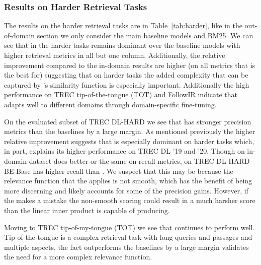 \documentclass[sigconf,]{acmart}
\begin{document}
\subsubsection{Results on Harder Retrieval Tasks}
The results on the harder retrieval tasks are in Table~\ref{tab:harder}, like in the out-of-domain section we only consider the main baseline models and BM25. We can see that in the harder tasks \name{} remains dominant over the baseline models with higher retrieval metrics in all but one column. Additionally, the relative improvement compared to the in-domain results are higher (on all metrics that \name{} is the best for) suggesting that on harder tasks the added complexity that can be captured by \name{}'s similarity function is especially important. Additionally the high performance on TREC tip-of-the-tongue (TOT) and FollowIR indicate that \name{} adapts well to different domains through domain-specific fine-tuning.

On the evaluated subset of TREC DL-HARD we see that \name{} has stronger precision metrics than the baselines by a large margin. As mentioned previously the higher relative improvement suggests that \name{} is especially dominant on harder tasks which, in part, explains its higher performance on TREC DL '19 and '20. Though on in-domain dataset \name{} does better or the same on recall metrics, on TREC DL-HARD BE-Base has higher recall than \name{}. We suspect that this may be because the relevance function that the \mininame{} applies is not smooth, which has the benefit of being more discerning and likely accounts for some of the precision gains. However, if the \mininame{} makes a mistake the non-smooth scoring could result in a much harsher score than the linear inner product is capable of producing.

Moving to TREC tip-of-my-tongue (TOT) we see that \name{} continues to perform well. Tip-of-the-tongue is a complex retrieval task with long queries and passages and multiple aspects, the fact \name{} outperforms the baselines by a large margin validates the need for a more complex relevance function.
\end{document}

